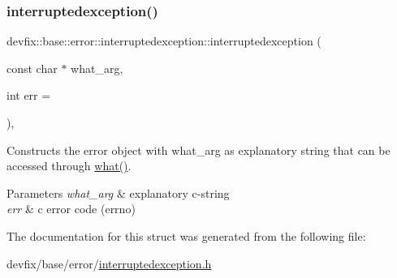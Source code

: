 \subsubsection{\texorpdfstring{interruptedexception()}{interruptedexception()}\hspace{0.1cm}{\footnotesize\ttfamily [2/2]}}
{\footnotesize\ttfamily devfix\+::base\+::error\+::interruptedexception\+::interruptedexception (\begin{DoxyParamCaption}\item[{const char $\ast$}]{what\+\_\+arg,  }\item[{int}]{err = {} }\end{DoxyParamCaption})\hspace{0.3cm}{\ttfamily [inline]}, {\ttfamily [explicit]}}

Constructs the error object with what\+\_\+arg as explanatory string that can be accessed through \hyperlink{structdevfix_1_1base_1_1error_1_1baseexception_a16327152a55d65b1e537825231fbd452}{what()}. 
\begin{DoxyParams}{Parameters}
{\em what\+\_\+arg} & explanatory c-\/string \\
\hline
{\em err} & c error code (errno) \\
\hline
\end{DoxyParams}


The documentation for this struct was generated from the following file\+:\begin{DoxyCompactItemize}
\item 
devfix/base/error/\hyperlink{interruptedexception_8h}{interruptedexception.\+h}\end{DoxyCompactItemize}
